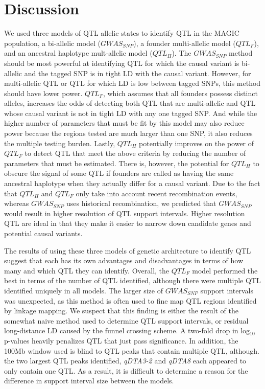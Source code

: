 \documentclass[9pt,twocolumn,twoside]{gsag3jnl}
\begin{document}
\section{Discussion}

We used three models of QTL allelic states to identify QTL in the MAGIC population, a bi-allelic model ($GWAS_{SNP}$), a founder multi-allelic model ($QTL_F$), and an ancestral haplotype mult-allelic model ($QTL_H$).
The $GWAS_{SNP}$ method should be most powerful at identifying QTL for which the causal variant is bi-allelic and the tagged SNP is in tight LD with the causal variant.
However, for multi-allelic QTL or QTL for which LD is low between tagged SNPs, this method should have lower power.
$QTL_F$, which assumes that all founders possess distinct alleles, increases the odds of detecting both QTL that are multi-allelic and QTL whose causal variant is not in tight LD with any one tagged SNP.
And while the higher number of parameters that must be fit by this model may also reduce power because the regions tested are much larger than one SNP, it also reduces the multiple testing burden.
Lastly, $QTL_H$ potentially improves on the power of $QTL_F$ to detect QTL that meet the above criteria by reducing the number of parameters that must be estimated.
There is, however, the potential for $QTL_H$ to obscure the signal of some QTL if founders are called as having the same ancestral haplotype when they actually differ for a causal variant.
Due to the fact that $QTL_H$ and $QTL_F$ only take into account recent recombination events, whereas $GWAS_{SNP}$ uses historical recombination, we predicted that $GWAS_{SNP}$ would result in higher resolution of QTL support intervals.
Higher resolution QTL are ideal in that they make it easier to narrow down candidate genes and potential causal variants.

The results of using these three models of genetic architecture to identify QTL suggest that each has its own advantages and disadvantages in terms of how many and which QTL they can identify.
Overall, the $QTL_F$ model performed the best in terms of the number of QTL identified, although there were multiple QTL identified uniquely in all models.
The larger size of $GWAS_{SNP}$ support intervals was unexpected, as this method is often used to fine map QTL regions identified by linkage mapping.
We suspect that this finding is either the result of the somewhat naive method used to determine QTL support intervals, or residual long-distance LD caused by the funnel crossing scheme.
A two-fold drop in log$_{10}$ p-values heavily penalizes QTL that just pass significance.
In addition, the 100Mb window used is blind to QTL peaks that contain multiple QTL, although. the two largest QTL peaks identified, \emph{qDTA3-2} and \emph{qDTA8} each appeared to only contain one QTL.
As a result, it is difficult to determine a reason for the difference in support interval size between the models.
\end{document}
